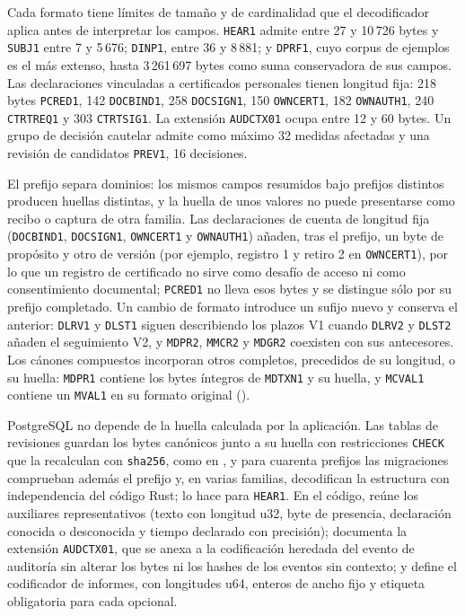 Cada formato tiene límites de tamaño y de cardinalidad que el decodificador aplica antes de interpretar los campos. \texttt{HEAR1} admite entre 27 y 10\,726 bytes y \texttt{SUBJ1} entre 7 y 5\,676; \texttt{DINP1}, entre 36 y 8\,881; y \texttt{DPRF1}, cuyo corpus de ejemplos es el más extenso, hasta 3\,261\,697 bytes como suma conservadora de sus campos. Las declaraciones vinculadas a certificados personales tienen longitud fija: 218 bytes \texttt{PCRED1}, 142 \texttt{DOCBIND1}, 258 \texttt{DOCSIGN1}, 150 \texttt{OWNCERT1}, 182 \texttt{OWNAUTH1}, 240 \texttt{CTRTREQ1} y 303 \texttt{CTRTSIG1}. La extensión \texttt{AUDCTX01} ocupa entre 12 y 60 bytes. Un grupo de decisión cautelar admite como máximo 32 medidas afectadas y una revisión de candidatos \texttt{PREV1}, 16 decisiones.

El prefijo separa dominios: los mismos campos resumidos bajo prefijos distintos producen huellas distintas, y la huella de unos valores no puede presentarse como recibo o captura de otra familia. Las declaraciones de cuenta de longitud fija (\texttt{DOCBIND1}, \texttt{DOCSIGN1}, \texttt{OWNCERT1} y \texttt{OWNAUTH1}) añaden, tras el prefijo, un byte de propósito y otro de versión (por ejemplo, registro 1 y retiro 2 en \texttt{OWNCERT1}), por lo que un registro de certificado no sirve como desafío de acceso ni como consentimiento documental; \texttt{PCRED1} no lleva esos bytes y se distingue sólo por su prefijo completado. Un cambio de formato introduce un sufijo nuevo y conserva el anterior: \texttt{DLRV1} y \texttt{DLST1} siguen describiendo los plazos V1 cuando \texttt{DLRV2} y \texttt{DLST2} añaden el seguimiento V2, y \texttt{MDPR2}, \texttt{MMCR2} y \texttt{MDGR2} coexisten con sus antecesores. Los cánones compuestos incorporan otros completos, precedidos de su longitud, o su huella: \texttt{MDPR1} contiene los bytes íntegros de \texttt{MDTXN1} y su huella, y \texttt{MCVAL1} contiene un \texttt{MVAL1} en su formato original ().

PostgreSQL no depende de la huella calculada por la aplicación. Las tablas de revisiones guardan los bytes canónicos junto a su huella con restricciones \texttt{CHECK} que la recalculan con \texttt{sha256}, como en , y para cuarenta prefijos las migraciones comprueban además el prefijo y, en varias familias, decodifican la estructura con independencia del código Rust;  lo hace para \texttt{HEAR1}. En el código,  reúne los auxiliares representativos (texto con longitud u32, byte de presencia, declaración conocida o desconocida y tiempo declarado con precisión);  documenta la extensión \texttt{AUDCTX01}, que se anexa a la codificación heredada del evento de auditoría sin alterar los bytes ni los hashes de los eventos sin contexto; y  define el codificador de informes, con longitudes u64, enteros de ancho fijo y etiqueta obligatoria para cada opcional.

